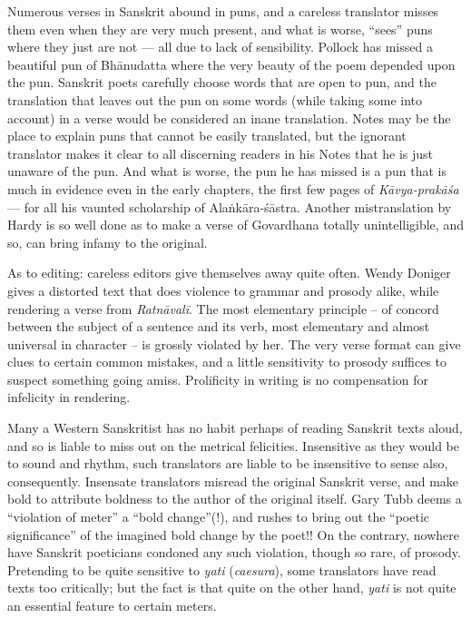 Numerous verses in Sanskrit abound in puns, and a careless translator misses them even when they are very much present, and what is worse, “sees” puns where they just are not --- all due to lack of sensibility. Pollock has missed a beautiful pun of Bhānudatta where the very beauty of the poem depended upon the pun. Sanskrit poets carefully choose words that are open to pun, and the translation that leaves out the pun on some words (while taking some into account) in a verse would be considered an inane translation. Notes may be the place to explain puns that cannot be easily translated, but the ignorant translator makes it clear to all discerning readers in his Notes that he is just unaware of the pun. And what is worse, the pun he has missed is a pun that is much in evidence even in the early chapters, the first few pages of \textsl{Kāvya-prakāśa} --- for all his vaunted scholarship of Alaṅkāra-śāstra. Another mistranslation by Hardy is so well done as to make a verse of Govardhana totally unintelligible, and so, can bring infamy to the original.

As to editing: careless editors give themselves away quite often. Wendy Doniger gives a distorted text that does violence to grammar and prosody alike, while rendering a verse from \textsl{Ratnāvalī}. The most elementary principle -- of concord between the subject of a sentence and its verb, most elementary and almost universal in character -- is grossly violated by her. The very verse format can give clues to certain common mistakes, and a little sensitivity to prosody suffices to suspect something going amiss. Prolificity in writing is no compensation for infelicity in rendering.

Many a Western Sanskritist has no habit perhaps of reading Sanskrit texts aloud, and so is liable to miss out on the metrical felicities. Insensitive as they would be to sound and rhythm, such translators are liable to be insensitive to sense also, consequently. Insensate translators misread the original Sanskrit verse, and make bold to attribute boldness to the author of the original itself. Gary Tubb deems a “violation of meter” a “bold change”(!), and rushes to bring out the “poetic significance” of the imagined bold change by the poet!! On the contrary, nowhere have Sanskrit poeticians condoned any such violation, though so rare, of prosody. Pretending to be quite sensitive to \textsl{yati} (\textsl{caesura}), some translators have read texts too critically; but the fact is that quite on the other hand, \textsl{yati} is not quite an essential feature to certain meters.

